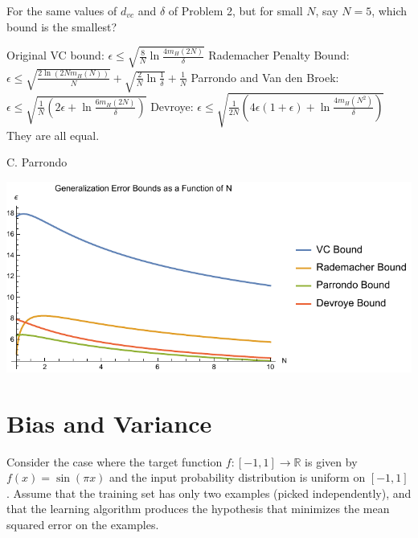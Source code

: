 \documentclass[answers]{exam}
\begin{document}
\begin{questions}
\question
For the same values of $d_{vc}$ and $\delta$ of Problem 2, but for small $N$, say 
$N = 5$, which bound is the smallest?
\begin{choices}
    \choice Original VC bound: 
        $\epsilon \leq \sqrt{\frac{8}{N} \ln \frac{4m_H(2N)}{\delta}}$
    \choice Rademacher Penalty Bound: 
        $\epsilon \leq \sqrt{\frac{2 \ln(2Nm_H(N))}{N}} + 
        \sqrt{\frac{2}{N} \ln \frac{1}{\delta}} + \frac{1}{N}$
    \choice Parrondo and Van den Broek: 
        $\epsilon \leq \sqrt{\frac{1}{N} \left(2\epsilon + \ln 
        \frac{6m_H(2N)}{\delta}\right)}$
    \choice Devroye: 
        $\epsilon \leq \sqrt{\frac{1}{2N} \left(4\epsilon(1 + \epsilon) + 
        \ln \frac{4m_H(N^2)}{\delta}\right)}$
    \choice They are all equal.
\end{choices}

\begin{solution}
C. Parrondo

\includegraphics[width=\textwidth]{img/p4-3-zoom.pdf}
\end{solution}
\end{questions}

\section*{Bias and Variance}

Consider the case where the target function $f:[-1, 1] \to \mathbb{R}$ is
given by $f(x) = \sin(\pi x)$ and the input probability distribution is
uniform on $[-1, 1]$. Assume that the training set has only two examples
(picked independently), and that the learning algorithm produces the
hypothesis that minimizes the mean squared error on the examples.
\end{document}
